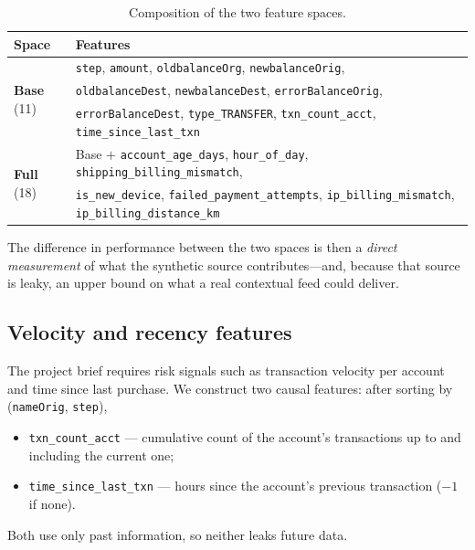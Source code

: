 \documentclass{article}
\begin{document}
\begin{table}[H]
\centering
\caption{Composition of the two feature spaces.}
\label{tab:spaces}
\footnotesize
\begin{tabular}{ll}
\toprule
Space & Features \\
\midrule
\multirow{3}{*}{\textbf{Base} (11)}
 & \texttt{step}, \texttt{amount}, \texttt{oldbalanceOrg}, \texttt{newbalanceOrig}, \\
 & \texttt{oldbalanceDest}, \texttt{newbalanceDest}, \texttt{errorBalanceOrig}, \\
 & \texttt{errorBalanceDest}, \texttt{type\_TRANSFER}, \texttt{txn\_count\_acct}, \texttt{time\_since\_last\_txn} \\
\midrule
\multirow{2}{*}{\textbf{Full} (18)}
 & Base $+$ \texttt{account\_age\_days}, \texttt{hour\_of\_day}, \texttt{shipping\_billing\_mismatch}, \\
 & \texttt{is\_new\_device}, \texttt{failed\_payment\_attempts}, \texttt{ip\_billing\_mismatch}, \texttt{ip\_billing\_distance\_km} \\
\bottomrule
\end{tabular}
\end{table}

The difference in performance between the two spaces is then a
\emph{direct measurement} of what the synthetic source contributes---and,
because that source is leaky, an upper bound on what a real contextual
feed could deliver.

\subsection{Velocity and recency features}
The project brief requires risk signals such as transaction velocity
per account and time since last purchase. We construct two causal
features: after sorting by (\texttt{nameOrig}, \texttt{step}),
\begin{itemize}
    \item \texttt{txn\_count\_acct} --- cumulative count of the
    account's transactions up to and including the current one;
    \item \texttt{time\_since\_last\_txn} --- hours since the account's
    previous transaction ($-1$ if none).
\end{itemize}
Both use only past information, so neither leaks future data.
\end{document}
